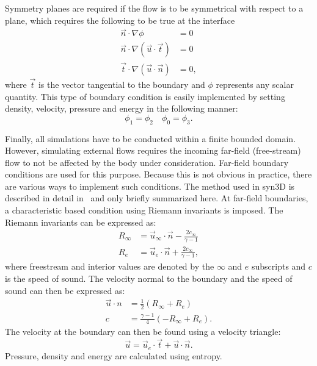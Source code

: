 Symmetry planes are required if the flow is to be symmetrical with respect to a plane, which requires the following to be true at the interface
\begin{align*}
    \vec{n}\cdot\nabla\phi &= 0 \\
    \vec{n}\cdot\nabla(\vec{u}\cdot\vec{t}) &= 0\\
    \vec{t}\cdot\nabla(\vec{u}\cdot\vec{n}) &= 0,
\end{align*}
where $\vec{t}$ is the vector tangential to the boundary and $\phi$ represents any scalar quantity. This type of boundary condition is easily implemented by setting density, velocity, pressure and energy in the following manner:
\begin{equation*}
    \phi_1 = \phi_2 \quad \phi_0 = \phi_3.
\end{equation*}

Finally, all simulations have to be conducted within a finite bounded domain. However, simulating external flows requires the incoming far-field (free-stream) flow to not be affected by the body under consideration. Far-field boundary conditions are used for this purpose. Because this is not obvious in practice, there are various ways to implement such conditions. The method used in syn3D is described in detail in~\cite{jameson1983solution} and only briefly summarized here. At far-field boundaries, a characteristic based condition using Riemann invariants is imposed. The Riemann invariants can be expressed as:
\begin{align*}
    R_\infty &= \vec{u}_\infty\cdot\vec{n} - \frac{2 c_\infty}{\gamma - 1} \\
    R_e &= \vec{u}_e\cdot\vec{n} + \frac{2 c_\infty}{\gamma - 1},
\end{align*}
where freestream and interior values are denoted by the $\infty$ and $e$ subscripts and $c$ is the speed of sound. The velocity normal to the boundary and the speed of sound can then be expressed as:
\begin{align*}
    \vec{u}\cdot{n} &= \frac{1}{2}(R_\infty + R_e) \\
    c &= \frac{\gamma - 1}{4}(-R_\infty + R_e).
\end{align*}
The velocity at the boundary can then be found using a velocity triangle:
\begin{equation*}
    \vec{u} = \vec{u}_e\cdot\vec{t} + \vec{u}\cdot\vec{n}.
\end{equation*}
Pressure, density and energy are calculated using entropy.
%
%
